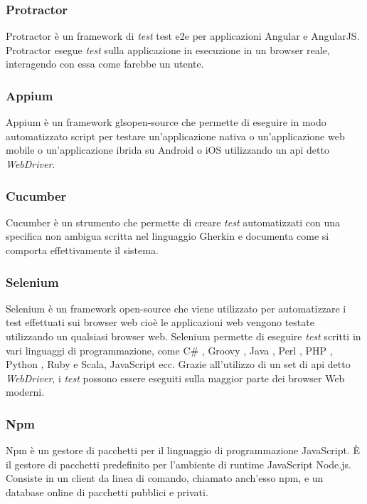 \subsubsection*{Protractor}
Protractor è un \gls{framework}\ap{[g]} di \emph{test} \gls{test e2e}\ap{[g]} per applicazioni Angular e AngularJS. Protractor esegue \emph{test} sulla applicazione in esecuzione in un browser reale, interagendo con essa come farebbe un utente.

\subsubsection*{Appium}
Appium è un \gls{framework}\ap{[g]} gls{open-source}\ap{[g]} che permette di eseguire in modo automatizzato script per testare un'\gls{applicazione nativa}\ap{[g]} o un'\gls{applicazione web mobile}\ap{[g]} o un'\gls{applicazione ibrida}\ap{[g]} su \gls{Android}\ap{[g]} o \gls{iOS}\ap{[g]} utilizzando un \gls{api}\ap{[g]} detto \emph{WebDriver}.

\subsubsection*{Cucumber}
Cucumber è un strumento che permette di creare \emph{test} automatizzati con una specifica non ambigua scritta nel linguaggio Gherkin e documenta come si comporta effettivamente il sistema.

\subsubsection*{Selenium}
Selenium è un \gls{framework}\ap{[g]} \gls{open-source}\ap{[g]} che viene utilizzato per automatizzare i test effettuati sui browser web cioè le applicazioni web vengono testate utilizzando un qualsiasi browser web. Selenium permette di eseguire \emph{test} scritti in vari linguaggi di programmazione, come C\# , Groovy , Java , Perl , PHP , Python , Ruby e Scala, JavaScript ecc. Grazie all'utilizzo di un set di \gls{api}\ap{[g]} detto \emph{WebDriver}, i \emph{test} possono essere eseguiti sulla maggior parte dei browser Web moderni.

\subsubsection*{Npm}
Npm è un gestore di pacchetti per il linguaggio di programmazione JavaScript. È il gestore di pacchetti predefinito per l'ambiente di runtime JavaScript Node.js. Consiste in un client da linea di comando, chiamato anch'esso npm, e un database online di pacchetti pubblici e privati.

